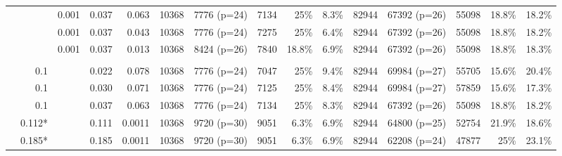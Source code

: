 \begin{table*}[t]
\begin{tabular}{|l|rrrrrrrrrrrrrr|}
    & \color{red}{0.10} & 0.001 & 0.037 & 0.063 & 10368 & 7776 (p=24) & 7134 & 25\% & 8.3\% & 82944 & 67392 (p=26) & 55098 & 18.8\% & 18.2\% \\
    
    & \color{red}{0.08} & 0.001 & 0.037 & 0.043 & 10368 & 7776 (p=24) & 7275 & 25\% & 6.4\% & 82944 & 67392 (p=26) & 55098 & 18.8\% & 18.2\% \\
    
    & \color{red}{0.05} & 0.001 & 0.037 & 0.013 & 10368 & 8424 (p=26) & 7840 & 18.8\% & 6.9\% & 82944 & 67392 (p=26) & 55098 & 18.8\% & 18.3\% \\
    
    & & & & & & & & & & & & & &\\
    
    & 0.1 & \color{red}{0.0006} & 0.022 & 0.078 & 10368 & 7776 (p=24) & 7047 & 25\% & 9.4\% & 82944 & 69984 (p=27) & 55705 & 15.6\% & 20.4\% \\
    
    & 0.1 & \color{red}{0.0008} & 0.030 & 0.071 & 10368 & 7776 (p=24) & 7125 & 25\% & 8.4\% & 82944 & 69984 (p=27) & 57859 & 15.6\% & 17.3\% \\
    
    & 0.1 & \color{red}{0.0010} & 0.037 & 0.063 & 10368 & 7776 (p=24) & 7134 & 25\% & 8.3\% & 82944 & 67392 (p=26) & 55098 & 18.8\% & 18.2\% \\
    
    & 0.112* & \color{red}{0.0030} & 0.111 & 0.0011 & 10368 &  9720 (p=30) & 9051 & 6.3\% & 6.9\% & 82944 & 64800 (p=25) & 52754 & 21.9\% & 18.6\% \\
    
    & 0.185* &\color{red}{0.0050} & 0.185 & 0.0011 & 10368 & 9720 (p=30) & 9051 & 6.3\% & 6.9\% & 82944 & 62208 (p=24) & 47877 & 25\%& 23.1\% \\
    \cline{1-15}
  \end{tabular}
\end{table*}